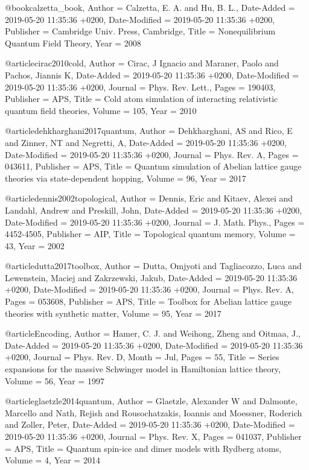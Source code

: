 \documentclass[epj,final]{svjour}
\begin{document}
@book{calzetta_book,
	Author = {Calzetta, E. A. and Hu, B. L.},
	Date-Added = {2019-05-20 11:35:36 +0200},
	Date-Modified = {2019-05-20 11:35:36 +0200},
	Publisher = {Cambridge Univ. Press, Cambridge},
	Title = {{Nonequilibrium Quantum Field Theory}},
	Year = {2008}}

@article{cirac2010cold,
	Author = {Cirac, J Ignacio and Maraner, Paolo and Pachos, Jiannis K},
	Date-Added = {2019-05-20 11:35:36 +0200},
	Date-Modified = {2019-05-20 11:35:36 +0200},
	Journal = {Phys. Rev. Lett.},
	Pages = {190403},
	Publisher = {APS},
	Title = {Cold atom simulation of interacting relativistic quantum field theories},
	Volume = {105},
	Year = {2010}}

@article{dehkharghani2017quantum,
	Author = {Dehkharghani, AS and Rico, E and Zinner, NT and Negretti, A},
	Date-Added = {2019-05-20 11:35:36 +0200},
	Date-Modified = {2019-05-20 11:35:36 +0200},
	Journal = {Phys. Rev. A},
	Pages = {043611},
	Publisher = {APS},
	Title = {Quantum simulation of Abelian lattice gauge theories via state-dependent hopping},
	Volume = {96},
	Year = {2017}}

@article{dennis2002topological,
	Author = {Dennis, Eric and Kitaev, Alexei and Landahl, Andrew and Preskill, John},
	Date-Added = {2019-05-20 11:35:36 +0200},
	Date-Modified = {2019-05-20 11:35:36 +0200},
	Journal = {J. Math. Phys.},
	Pages = {4452-4505},
	Publisher = {AIP},
	Title = {Topological quantum memory},
	Volume = {43},
	Year = {2002}}

@article{dutta2017toolbox,
	Author = {Dutta, Omjyoti and Tagliacozzo, Luca and Lewenstein, Maciej and Zakrzewski, Jakub},
	Date-Added = {2019-05-20 11:35:36 +0200},
	Date-Modified = {2019-05-20 11:35:36 +0200},
	Journal = {Phys. Rev. A},
	Pages = {053608},
	Publisher = {APS},
	Title = {Toolbox for Abelian lattice gauge theories with synthetic matter},
	Volume = {95},
	Year = {2017}}

@article{Encoding,
	Author = {Hamer, C. J. and Weihong, Zheng and Oitmaa, J.},
	Date-Added = {2019-05-20 11:35:36 +0200},
	Date-Modified = {2019-05-20 11:35:36 +0200},
	Journal = {Phys. Rev. D},
	Month = {Jul},
	Pages = {55},
	Title = {{Series expansions for the massive Schwinger model in Hamiltonian lattice theory}},
	Volume = {56},
	Year = {1997}}

@article{glaetzle2014quantum,
	Author = {Glaetzle, Alexander W and Dalmonte, Marcello and Nath, Rejish and Rousochatzakis, Ioannis and Moessner, Roderich and Zoller, Peter},
	Date-Added = {2019-05-20 11:35:36 +0200},
	Date-Modified = {2019-05-20 11:35:36 +0200},
	Journal = {Phys. Rev. X},
	Pages = {041037},
	Publisher = {APS},
	Title = {Quantum spin-ice and dimer models with {Rydberg} atoms},
	Volume = {4},
	Year = {2014}}
\end{document}
